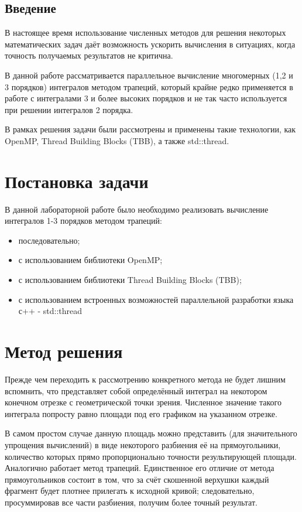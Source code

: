\documentclass{report}
\begin{document}
	\tableofcontents
	\newpage
	\chapter{Введение}
    В настоящее время использование численных методов для решения некоторых математических задач даёт возможность ускорить вычисления в ситуациях, когда точность получаемых результатов не критична.
    
    В данной работе рассматривается параллельное вычисление многомерных (1,2 и 3 порядков) интегралов методом трапеций, который крайне редко применяется в работе с интегралами 3 и более высоких порядков и не так часто используется при решении интегралов 2 порядка.
    
    В рамках решения задачи были рассмотрены и применены такие технологии, как OpenMP, Thread Building Blocks (TBB), а также std::thread.
\part{Постановка задачи}
В данной лабораторной работе было необходимо реализовать вычисление интегралов 1-3 порядков методом трапеций:
\begin{itemize}
\item последовательно;
\item с использованием библиотеки OpenMP;
\item с использованием библиотеки Thread Building Blocks (TBB);
\item с использованием встроенных возможностей параллельной разработки языка с++ - std::thread
\end{itemize}
\part{Метод решения}
Прежде чем переходить к рассмотрению конкретного метода не будет лишним вспомнить, что представляет собой определённый интеграл на некотором конечном отрезке с геометрической точки зрения. Численное значение такого интеграла попросту равно площади под его графиком на указанном отрезке. 

В самом простом случае данную площадь можно представить (для значительного упрощения вычислений) в виде некоторого разбиения её на прямоугольники, количество которых прямо пропорционально точности результирующей площади.
Аналогично работает метод трапеций. Единственное его отличие от метода прямоугольников состоит в том, что за счёт скошенной верхушки каждый фрагмент будет плотнее прилегать к исходной кривой; следовательно, просуммировав все части разбиения, получим более точный результат.
\end{document}
